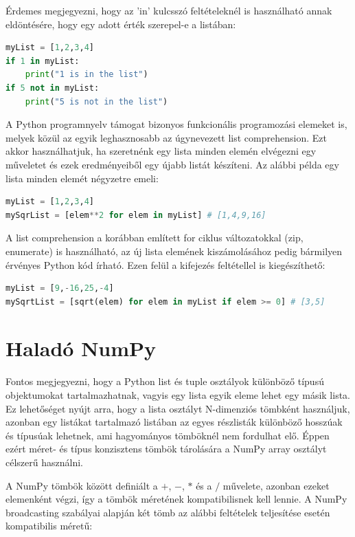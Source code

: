 \documentclass[12pt,a4paper,oneside]{report}             %
\begin{document}
Érdemes megjegyezni, hogy az 'in' kulcsszó feltételeknél is használható annak eldöntésére, hogy egy adott érték szerepel-e a listában:

\begin{lstlisting}[language=Python]
myList = [1,2,3,4]
if 1 in myList:
	print("1 is in the list")
if 5 not in myList:
	print("5 is not in the list")
\end{lstlisting}

A Python programnyelv támogat bizonyos funkcionális programozási elemeket is, melyek közül az egyik leghasznosabb az úgynevezett list comprehension. Ezt akkor használhatjuk, ha szeretnénk egy lista minden elemén elvégezni egy műveletet és ezek eredményeiből egy újabb listát készíteni. Az alábbi példa egy lista minden elemét négyzetre emeli:

\begin{lstlisting}[language=Python]
myList = [1,2,3,4]
mySqrList = [elem**2 for elem in myList] # [1,4,9,16]
\end{lstlisting}

A list comprehension a korábban említett for ciklus változatokkal (zip, enumerate) is használható, az új lista elemének kiszámolásához pedig bármilyen érvényes Python kód írható. Ezen felül a kifejezés feltétellel is kiegészíthető:

\begin{lstlisting}[language=Python]
myList = [9,-16,25,-4]
mySqrtList = [sqrt(elem) for elem in myList if elem >= 0] # [3,5]
\end{lstlisting}

\section{Haladó NumPy}

Fontos megjegyezni, hogy a Python list és tuple osztályok különböző típusú objektumokat tartalmazhatnak, vagyis egy lista egyik eleme lehet egy másik lista. Ez lehetőséget nyújt arra, hogy a lista osztályt N-dimenziós tömbként használjuk, azonban egy listákat tartalmazó listában az egyes részlisták különböző hosszúak és típusúak lehetnek, ami hagyományos tömböknél nem fordulhat elő. Éppen ezért méret- és típus konzisztens tömbök tárolására a NumPy array osztályt célszerű használni.

A NumPy tömbök között definiált a $+$, $-$, $*$ és a $/$ művelete, azonban ezeket elemenként végzi, így a tömbök méretének kompatibilisnek kell lennie. A NumPy broadcasting szabályai alapján két tömb az alábbi feltételek teljesítése esetén kompatibilis méretű:
\end{document}
